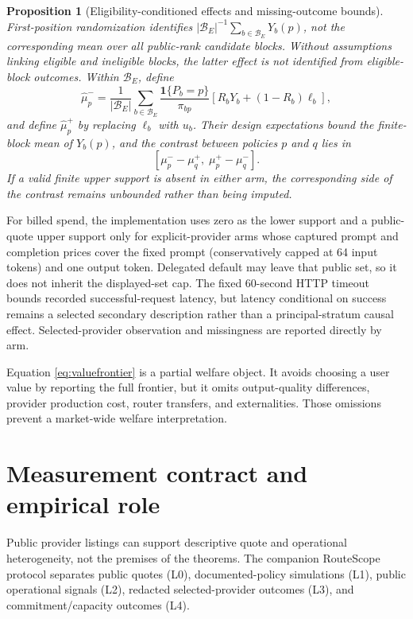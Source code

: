 \documentclass[11pt]{article}
\newtheorem{proposition}{Proposition}
\theoremstyle{definition}
\begin{document}
\begin{proposition}[Eligibility-conditioned effects and missing-outcome bounds]
\label{prop:eligibilitybounds}
First-position randomization identifies $|\mathcal B_E|^{-1}
\sum_{b\in\mathcal B_E}Y_b(p)$, not the corresponding mean over all public-rank
candidate blocks. Without assumptions linking eligible and ineligible blocks,
the latter effect is not identified from eligible-block outcomes. Within
$\mathcal B_E$, define
\[
 \widehat\mu_p^-=\frac1{|\mathcal B_E|}\sum_{b\in\mathcal B_E}
 \frac{\mathbf 1\{P_b=p\}}{\pi_{bp}}
 \left[R_bY_b+(1-R_b)\ell_b\right],
\]
and define $\widehat\mu_p^+$ by replacing $\ell_b$ with $u_b$. Their design
expectations bound the finite-block mean of $Y_b(p)$, and the contrast between
policies $p$ and $q$ lies in
\[
 [\mu_p^- - \mu_q^+,\;\mu_p^+ - \mu_q^-].
\]
If a valid finite upper support is absent in either arm, the corresponding side
of the contrast remains unbounded rather than being imputed.
\end{proposition}

For billed spend, the implementation uses zero as the lower support and a
public-quote upper support only for explicit-provider arms whose captured prompt
and completion prices cover the fixed prompt (conservatively capped at 64 input
tokens) and one output token. Delegated default may leave that public set, so it
does not inherit the displayed-set cap. The fixed 60-second HTTP timeout bounds
recorded successful-request latency, but latency conditional on success remains
a selected secondary description rather than a principal-stratum causal effect.
Selected-provider observation and missingness are reported directly by arm.

Equation \eqref{eq:valuefrontier} is a partial welfare object. It avoids choosing
a user value by reporting the full frontier, but it omits output-quality
differences, provider production cost, router transfers, and externalities.
Those omissions prevent a market-wide welfare interpretation.

\section{Measurement contract and empirical role}

Public provider listings can support descriptive quote and operational
heterogeneity, not the premises of the theorems. The companion RouteScope
protocol separates public quotes (L0), documented-policy simulations (L1),
public operational signals (L2), redacted selected-provider outcomes (L3), and
commitment/capacity outcomes (L4).
\end{document}
